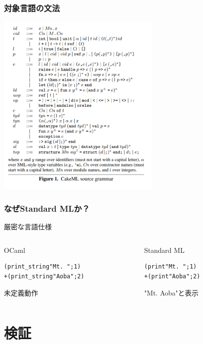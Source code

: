 \documentclass[dvipdfmx,cjk,xcolor=dvipsnames,envcountsect,notheorems,12pt]{beamer}
\theoremstyle{definition}
\begin{document}
\begin{frame}
	\frametitle{対象言語の文法}
	\begin{center}
		\includegraphics[width=80mm]{./syntax.png}
	\end{center}
\end{frame}

\begin{frame}[fragile]
	\frametitle{なぜStandard MLか？}
	\Large
	厳密な言語仕様
	\begin{columns}
		\begin{column}{0.55\textwidth}
			OCaml
			
			\vfill

\begin{lstlisting}
(print_string"Mt. ";1)
+(print_string"Aoba";2)
\end{lstlisting}

			\vfill

			未定義動作
		\end{column}
		\begin{column}{0.4\textwidth}
			Standard ML

			\vfill

\begin{lstlisting}
(print"Mt. ";1)
+(print"Aoba";2)
\end{lstlisting}

			\vfill

			"Mt. Aoba"と表示
		\end{column}
	\end{columns}
\end{frame}

\section{検証}
\end{document}
